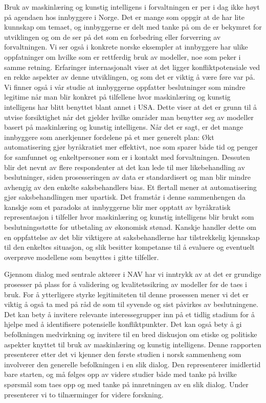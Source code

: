 \documentclass[
]{book}
\begin{document}
Bruk av maskinlæring og kunstig intelligens i forvaltningen er per i dag ikke høyt på agendaen hos innbyggere i Norge.
Det er mange som oppgir at de har lite kunnskap om temaet, og innbyggerne er delt med tanke på om de er bekymret for utviklingen og om de ser på det som en forbedring eller forverring av forvaltningen.
Vi ser også i konkrete norske eksempler at innbyggere har ulike oppfatninger om hvilke som er rettferdig bruk av modeller, noe som peker i samme retning.
Erfaringer internasjonalt viser at det ligger konfliktpotensiale ved en rekke aspekter av denne utviklingen, og som det er viktig å være føre var på.
Vi finner også i vår studie at innbyggerne oppfatter beslutninger som mindre legitime når man blir konkret på tilfellene hvor maskinlæring og kunstig intelligens har blitt benyttet blant annet i USA.
Dette viser at det er grunn til å utvise forsiktighet når det gjelder hvilke områder man benytter seg av modeller basert på maskinlæring og kunstig intelligens.
Når det er sagt, er det mange innbyggere som anerkjenner fordelene på et mer generelt plan:
Økt automatisering gjør byråkratiet mer effektivt, noe som sparer både tid og penger for samfunnet og enkeltpersoner som er i kontakt med forvaltningen.
Dessuten blir det nevnt av flere respondenter at det kan lede til mer likebehandling av beslutninger, siden prosesseringen av data er standardisert og man blir mindre avhengig av den enkelte saksbehandlers bias.
Et flertall mener at automatisering gjør saksbehandlingen mer upartisk.
Det framstår i denne sammenhengen da kanskje som et paradoks at innbyggerne blir mer opptatt av byråkratisk representasjon i tilfeller hvor maskinlæring og kunstig intelligens blir brukt som beslutningsstøtte for utbetaling av økonomisk stønad.
Kanskje handler dette om en oppfattelse av det blir viktigere at saksbehandlerne har tilstrekkelig kjennskap til den enkeltes situasjon, og slik besitter kompetanse til å evaluere og eventuelt overprøve modellene som benyttes i gitte tilfeller.

Gjennom dialog med sentrale aktører i NAV har vi inntrykk av at det er grundige prosesser på plass for å validering og kvalitetssikring av modeller før de taes i bruk.
For å ytterligere styrke legitimiteten til denne prosessen mener vi det er viktig å også ta med på råd de som til syvende og sist påvirkes av beslutningene.
Det kan bety å invitere relevante interessegrupper inn på et tidlig stadium for å hjelpe med å identifisere potensielle konfliktpunkter.
Det kan også bety å gi befolkningen medvirkning og invitere til en bred diskusjon om etiske og politiske aspekter knyttet til bruk av maskinlæring og kunstig intelligens.
Denne rapporten presenterer etter det vi kjenner den første studien i norsk sammenheng som involverer den generelle befolkningen i en slik dialog.
Den representerer imidlertid bare starten, og må følges opp av videre studier både med tanke på hvilke spørsmål som taes opp og med tanke på innretningen av en slik dialog.
Under presenterer vi to tilnærminger for videre forskning.
\end{document}
